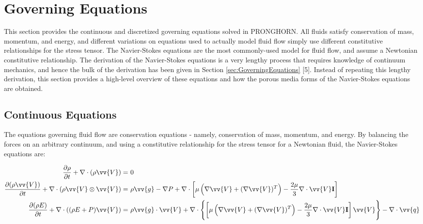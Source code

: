 \documentclass[10pt]{article}
\numberwithin{equation}{section} %
\begin{document}
\section{Governing Equations}

This section provides the continuous and discretized governing equations solved in PRONGHORN. All fluids satisfy conservation of mass, momentum, and energy, and different variations on equations used to actually model fluid flow simply use different constitutive relationships for the stress tensor. The Navier-Stokes equations are the most commonly-used model for fluid flow, and assume a Newtonian constitutive relationship. The derivation of the Navier-Stokes equations is a very lengthy process that requires knowledge of continuum mechanics, and hence the bulk of the derivation has been given in Section \ref{sec:GoverningEquations} [5]. Instead of repeating this lengthy derivation, this section provides a high-level overview of these equations and how the porous media forms of the Navier-Stokes equations are obtained. 

\subsection{Continuous Equations}
The equations governing fluid flow are conservation equations - namely, conservation of mass, momentum, and energy. By balancing the forces on an arbitrary continuum, and using a constitutive relationship for the stress tensor for a Newtonian fluid, the Navier-Stokes equations are:

\begin{equation}
\begin{aligned}
\frac{\partial\rho}{\partial t} + \nabla\cdot(\rho\vv{V})=&\ 0\\
\frac{\partial(\rho\vv{V})}{\partial t}+\nabla\cdot(\rho\vv{V}\otimes\vv{V})=&\ \rho \vv{g}-\nabla P+\nabla\cdot\left\lbrack\mu\left(\nabla \vv{V}+(\nabla \vv{V})^T\right)-\frac{2\mu}{3}\nabla\cdot\vv{V}\textbf{I}\right\rbrack\\
\frac{\partial (\rho E)}{\partial t}+\nabla\cdot((\rho E+P)\vv{V})=&\ \rho \vv{g}\cdot\vv{V}+\nabla\cdot\left\{\left\lbrack\mu\left(\nabla \vv{V}+(\nabla \vv{V})^T\right)-\frac{2\mu}{3}\nabla\cdot\vv{V}\textbf{I}\right\rbrack\vv{V}\right\}-\nabla\cdot\vv{q}\\
\end{aligned}
\end{equation}
\end{document}
